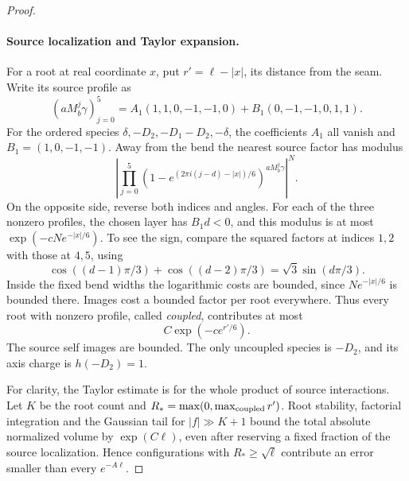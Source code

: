 \begin{proof}
\paragraph{Source localization and Taylor expansion.}
For a root at real coordinate \(x\), put \(r'=\ell-|x|\), its distance
from the seam. Write its source profile as
\[
 (aM_b^j\gamma)_{j=0}^5
 =A_1(1,1,0,-1,-1,0)+B_1(0,-1,-1,0,1,1).
\]
For the ordered species
\(\delta,-D_2,-D_1-D_2,-\delta\), the coefficients \(A_1\) all
vanish and \(B_1=(1,0,-1,-1)\). Away from the bend the nearest source
factor has modulus
\[
 \left|\prod_{j=0}^5
 (1-e^{(2\pi i(j-d)-|x|)/6})^{aM_b^j\gamma}\right|^N.
\]
On the opposite side, reverse both indices and angles. For each of the
three nonzero profiles, the chosen layer has \(B_1d<0\), and this
modulus is at most \(\exp(-cNe^{-|x|/6})\). To see the sign, compare
the squared factors at indices \(1,2\) with those at \(4,5\), using
\[
 \cos((d-1)\pi/3)+\cos((d-2)\pi/3)
       =\sqrt3\sin(d\pi/3).
\]
Inside the fixed bend widths the logarithmic costs are bounded, since
\(Ne^{-|x|/6}\) is bounded there. Images cost a bounded factor per
root everywhere. Thus every root with nonzero profile, called
\emph{coupled}, contributes at most
\[
 C\exp(-c e^{r'/6}).
\]
The source self images are bounded. The only uncoupled species is
\(-D_2\), and its axis charge is \(h(-D_2)=1\).

For clarity, the Taylor estimate is for the whole product of source
interactions. Let \(K\) be the root count and
\(R_* =\max(0,\max_{\rm coupled}r')\). Root stability, factorial
integration and the Gaussian tail for \(|f|\gg K+1\) bound the total
absolute normalized volume by \(\exp(C\ell)\), even after reserving a
fixed fraction of the source localization. Hence configurations with
\(R_*\ge\sqrt\ell\) contribute an error smaller than every
\(e^{-A\ell}\).


\end{proof}
